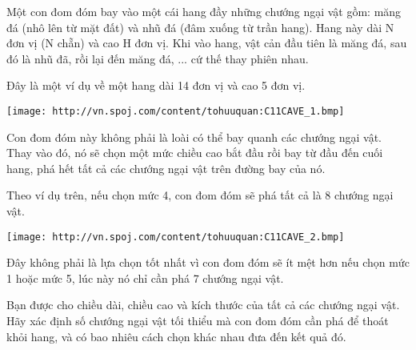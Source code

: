Một con đom đóm bay vào một cái hang đầy những chướng ngại vật gồm: măng đá (nhô lên từ mặt đất) và nhũ đá (đâm xuống từ trần hang). Hang này dài N đơn vị (N chẵn) và cao H đơn vị. Khi vào hang, vật cản đầu tiên là măng đá, sau đó là nhũ đã, rồi lại đến măng đá, ... cứ thế thay phiên nhau.

Đây là một ví dụ về một hang dài 14 đơn vị và cao 5 đơn vị.


\texttt{[image: http://vn.spoj.com/content/tohuuquan:C11CAVE\_1.bmp]}

Con đom đóm này không phải là loài có thể bay quanh các chướng ngại vật. Thay vào đó, nó sẽ chọn một mức chiều cao bắt đầu rồi bay từ đầu đến cuối hang, phá hết tất cả các chướng ngại vật trên đường bay của nó.

Theo ví dụ trên, nếu chọn mức 4, con đom đóm sẽ phá tất cả là 8 chướng ngại vật.


\texttt{[image: http://vn.spoj.com/content/tohuuquan:C11CAVE\_2.bmp]}

Đây không phải là lựa chọn tốt nhất vì con đom đóm sẽ ít mệt hơn nếu chọn mức 1 hoặc mức 5, lúc này nó chỉ cần phá 7 chướng ngại vật.

Bạn được cho chiều dài, chiều cao và kích thước của tất cả các chướng ngại vật. Hãy xác định số chướng ngại vật tối thiểu mà con đom đóm cần phá để thoát khỏi hang, và có bao nhiêu cách chọn khác nhau đưa đến kết quả đó.